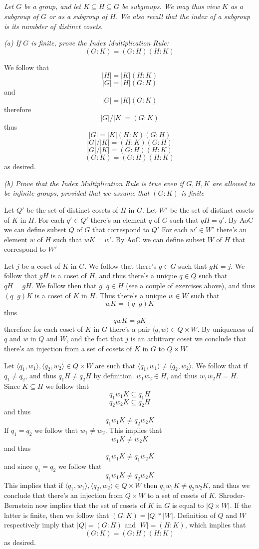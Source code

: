 \documentclass[11pt,oneside,titlepage]{book}
\DeclareMathOperator \inv {^{-1}}
\newcommand{\eangle}[1]{\langle #1 \rangle}
\begin{document}
\subsection{}

\textit{Let $G$ be a group, and let $K \subseteq H \subseteq G$ be
subgroups. We may thus view $K$ as a subgroup of $G$ or as a subgroup
of $H$. We also recall that the index of a subgroup is its numbder of
distinct cosets. }

\textit{(a) If $G$ is finite, prove the Index Multiplication Rule:
  $$(G:K) = (G:H) (H:K)$$
}

We follow that
$$|H| = |K| (H:K)$$
$$|G| = |H| (G:H)$$
and
$$|G| = |K| (G:K)$$
therefore
$$|G| / |K| =  (G:K)$$
thus
$$|G| = |K| (H:K) (G:H)$$
$$|G| / |K| =  (H:K) (G:H)$$
$$|G| / |K| =  (G:H) (H:K) $$
$$(G:K) =  (G:H) (H:K) $$
as desired.

\textit{(b) Prove that the Index Multiplication Rule is true even if
  $G, H, K$ are allowed to be infinite groups, provided that we assume
  that $(G:K)$ is finite}

Let $Q'$ be the set of distinct cosets of $H$ in $G$.  Let $W'$ be the
set of distinct cosets of $K$ in $H$.  For each $q' \in Q'$ there's an
element $q$ of $G$ such that $qH = q'$. By AoC we can define subset
$Q$ of $G$ that correspond to $Q'$ For each $w' \in W'$ there's an
element $w$ of $H$ such that $wK = w'$. By AoC we can define subset
$W$ of $H$ that correspond to $W'$

Let $j$ be a coset of $K$ in $G$. We follow that there's $g \in G$
such that $gK = j$. We follow that $gH$ is a coset of $H$, and thus
there's a unique $q \in Q$ such that $qH = gH$. We follow then that
$g\inv q \in H$ (see a couple of exercises above), and thus $(q\inv g)
K$ is a coset of $K$ in $H$. Thus there's a unique $w \in W$ such that
$$w K = (q\inv g ) K$$
thus
$$q w K = gK$$
therefore for each coset of $K$ in $G$ there's a pair $\eangle{q, w}
\in Q \times W$. By uniqueness of $q$ and $w$ in $Q$ and $W$,
and the fact that $j$ is an arbitrary coset we
conclude that there's an injection from a set
of cosets of $K$ in $G$ to $Q \times W$.

Let $\eangle{q_1, w_1}, \eangle{q_2, w_2} \in Q \times W$ are such that
$\eangle{q_1, w_1} \neq \eangle{q_2, w_2}$. We follow that
if $q_1 \neq q_2$, and thus $q_1 H \neq q_2 H$ by definition.
$w_1 w_2 \in H$, and thus $w_1 w_2 H = H$. Since $K \subseteq H$ we follow that
$$q_1 w_1 K \subseteq q_1 H$$
$$q_2 w_2 K \subseteq q_2 H$$
and thus
$$q_1 w_1 K \neq q_2 w_2 K$$
If $q_1 = q_2$ we follow that $w_1 \neq w_2$. This implies that
$$w_1 K \neq w_2 K$$
and thus
$$q_1 w_1 K \neq q_1 w_2 K$$
and since $q_1 = q_2$ we follow that
$$q_1 w_1 K \neq q_2 w_2 K$$
This implies that if $\eangle{q_1, w_1}, \eangle{q_2, w_2} \in Q \times W$ then
$q_1 w_1 K \neq q_2 w_2 K$, and thus we conclude that there's an injection from
$Q \times W$ to a set of cosets of $K$. Shroder-Bernstein now implies that
the set of cosets of $K$ in $G$ is equal to $|Q \times W|$. If the latter is finite,
then we follow that $(G:K) = |Q| * |W|$. Definition of $Q$ and $W$ respectively
imply that $|Q| = (G:H)$ and $|W| = (H:K)$, which implies that
$$(G:K) = (G:H) (H:K)$$
as desired.
\end{document}
